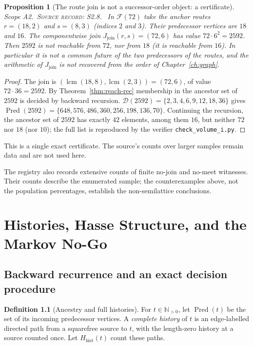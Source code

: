 \documentclass[11pt,oneside,openany]{book}
\newtheorem{proposition}[theorem]{Proposition}
\theoremstyle{definition}
\newtheorem{definition}[theorem]{Definition}
\theoremstyle{remark}
\newcommand{\N}{\mathbb{N}}
\newcommand{\Fx}{\mathcal{F}}
\newcommand{\Dx}{\mathcal{D}}
\newcommand{\lcmop}{\operatorname{lcm}}
\newcommand{\Pred}{\operatorname{Pred}}
\newcommand{\scope}[1]{\textsf{\small Scope #1.}\ }
\newcommand{\record}[1]{\textup{\textsc{Source record: #1.}}\ }
\newcommand{\join}{J_{\mathrm{join}}}
\newcommand{\nohist}{H_{\mathrm{hist}}}
\begin{document}
\begin{proposition}[The route join is not a successor-order object: a certificate]\label{prop:joinintr}
\scope{A2}\record{S2.8} In \(\Fx(72)\) take the anchor routes \(r=(18,2)\) and \(s=(8,3)\) (indices \(2\) and \(3\)). Their predecessor vertices are \(18\) and \(16\). The componentwise join \(\join(r,s)=(72,6)\) has value \(72\cdot6^2=2592\). Then \(2592\) is not reachable from \(72\), nor from \(18\) (it is reachable from \(16\)). In particular it is not a common future of the two predecessors of the routes, and the arithmetic of \(\join\) is not recovered from the order of Chapter~\ref{ch:graph}.
\end{proposition}
\begin{proof}
The join is \((\lcmop(18,8),\lcmop(2,3))=(72,6)\), of value \(72\cdot36=2592\). By Theorem~\ref{thm:reach-rec} membership in the ancestor set of \(2592\) is decided by backward recursion. \(\Dx(2592)=\{2,3,4,6,9,12,18,36\}\) gives \(\Pred(2592)=\{648,576,486,360,256,198,136,70\}\). Continuing the recursion, the ancestor set of \(2592\) has exactly \(42\) elements, among them \(16\), but neither \(72\) nor \(18\) (nor \(10\)); the full list is reproduced by the verifier \texttt{check\_volume\_i.py}.
\end{proof}
This is a single exact certificate. The source's counts over larger samples remain data and are not used here.

The registry also records extensive counts of finite no-join and no-meet witnesses. Their counts describe the enumerated sample; the counterexamples above, not the population percentages, establish the non-semilattice conclusions.

\chapter{Histories, Hasse Structure, and the Markov No-Go}\label{ch:histories}
\section{Backward recurrence and an exact decision procedure}
\begin{definition}[Ancestry and full histories]
For \(t\in\N_{>0}\), let \(\Pred(t)\) be the set of its incoming predecessor vertices. A \emph{complete history} of \(t\) is an edge-labelled directed path from a squarefree source to \(t\), with the length-zero history at a source counted once. Let \(\nohist(t)\) count these paths.
\end{definition}
\end{document}
